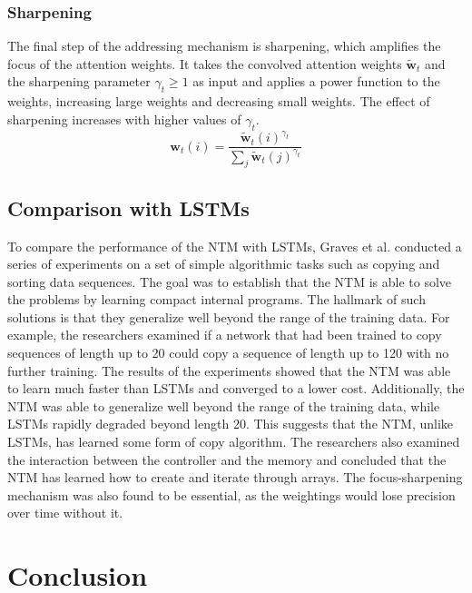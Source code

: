 \documentclass{article}
\begin{document}
\subsubsection{Sharpening}
\label{sec:4.1.3}

The final step of the addressing mechanism is sharpening, which amplifies the focus of the
attention weights. It takes the convolved attention weights $\tilde{\textbf{w}}_t$ and the
sharpening parameter $\gamma_t \geq 1$ as input and applies a power function to the
weights, increasing large weights and decreasing small weights. The effect of sharpening
increases with higher values of $\gamma_t$.
\begin{equation}
  \textbf{w}_t(i) = \frac{\tilde{\textbf{w}}_t(i)^{\gamma_t}}{\sum_{j} \tilde{\textbf{w}}_t(j)^{\gamma_t}}
\end{equation}


\subsection{Comparison with LSTMs}
\label{sec:4.2}

To compare the performance of the NTM with LSTMs, Graves et al. conducted a series of
experiments on a set of simple algorithmic tasks such as copying and sorting data
sequences. The goal was to establish that the NTM is able to solve the problems by
learning compact internal programs. The hallmark of such solutions is that they generalize
well beyond the range of the training data. For example, the researchers examined if a
network that had been trained to copy sequences of length up to 20 could copy a sequence
of length up to 120 with no further training. The results of the experiments showed that
the NTM was able to learn much faster than LSTMs and converged to a lower cost.
Additionally, the NTM was able to generalize well beyond the range of the training data,
while LSTMs rapidly degraded beyond length 20. This suggests that the NTM, unlike LSTMs,
has learned some form of copy algorithm. The researchers also examined the interaction
between the controller and the memory and concluded that the NTM has learned how to create
and iterate through arrays. The focus-sharpening mechanism was also found to be essential,
as the weightings would lose precision over time without it.


\section{Conclusion}
\label{ch:5}
\end{document}
